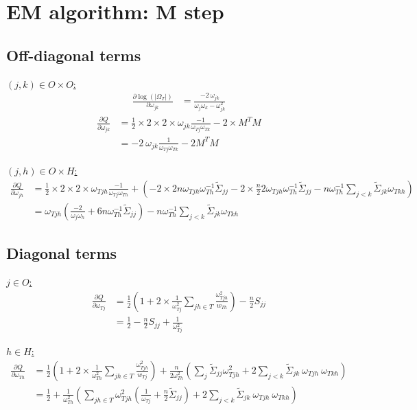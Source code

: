 \documentclass[11pt,a4paper]{article}
\begin{document}
\section{EM algorithm: M step}
\subsection{Off-diagonal terms}
\underline{$(j,k)\in O\times O$:}
\begin{align*}
\frac{\partial \log(|\Omega_T|)}{\partial \omega_{jk}} &= \frac{-2 \: \omega_{jk}}{\omega_j \omega_k -\omega_{jk}^2}
\end{align*}
\begin{align*}
\frac{\partial Q}{\partial \omega_{jk}} &= \frac{1}{2}\times 2\times 2\times\omega_{jk} \frac{-1}{\omega_{Tj}\omega_{Tk}} -  2 \times M^TM\\
&= -2 \: \omega_{jk} \frac{1}{\omega_{Tj}\omega_{Tk}} - 2 M^TM
\end{align*}
\vspace{1cm}

\underline{$(j,h)\in O\times H$:}
\begin{align*}
\frac{\partial Q}{\partial \omega_{jh}}  &=\frac{1}{2}\times 2\times 2\times\omega_{Tjh} \frac{-1}{\omega_{Tj}\omega_{Th}} +\left( -2\times 2n\omega_{Tjh}\omega_{Th}^{-1} \tilde{\Sigma}_{jj} - 2\times \frac{n}{2}2\omega_{Tjh} \omega_{Th}^{-1}\tilde{\Sigma}_{jj} -n\omega_{Th}^{-1}\sum_{j < k} \tilde{\Sigma}_{jk}\omega_{Tkh} \right)\\
&=\omega_{Tjh}\left(\frac{-2}{\omega_{j}\omega_{h}} + 6n \omega_{Th}^{-1} \tilde{\Sigma}_{jj} \right) -n\omega_{Th}^{-1}\sum_{j < k} \tilde{\Sigma}_{jk}\omega_{Tkh} 
\end{align*}

\subsection{Diagonal terms}
\underline{$j\in O $:}
\begin{align*}
\frac{\partial Q}{\partial \omega_{Tj}}  &= \frac{1}{2}\left(1+2\times \frac{1}{\omega_{Tj}^2}\sum_{jh\in T} \frac{\omega_{Tjh}^2}{w_{Th}}\right) -\frac{n}{2}S_{jj}\\
&=\frac{1}{2} - \frac{n}{2} S_{jj} + \frac{1}{\omega_{Tj}^2}
\end{align*}
\vspace{1cm}


\underline{$h\in H$:}
\begin{align*}
\frac{\partial Q}{\partial \omega_{Th}}  &= \frac{1}{2}\left(1+2\times \frac{1}{\omega_{Th}^2}\sum_{jh\in T} \frac{\omega_{Tjh}^2}{w_{Tj}}\right) + \frac{n}{2\omega_{Th}^2} \left( \sum_j \tilde{\Sigma}_{jj} \omega_{Tjh}^2 +2\sum_{j < k} \tilde{\Sigma}_{jk} \: \omega_{Tjh} \: \omega_{Tkh}\right)\\
&= \frac{1}{2} + \frac{1}{\omega_{Th}^2}\left(\sum_{jh\in T}\omega_{Tjh}^2 \left(\frac{1}{\omega_{Tj}} + \frac{n}{2}\tilde{\Sigma}_{jj}\right)+2\sum_{j < k} \tilde{\Sigma}_{jk} \: \omega_{Tjh} \: \omega_{Tkh}\right)
\end{align*}
\end{document}
